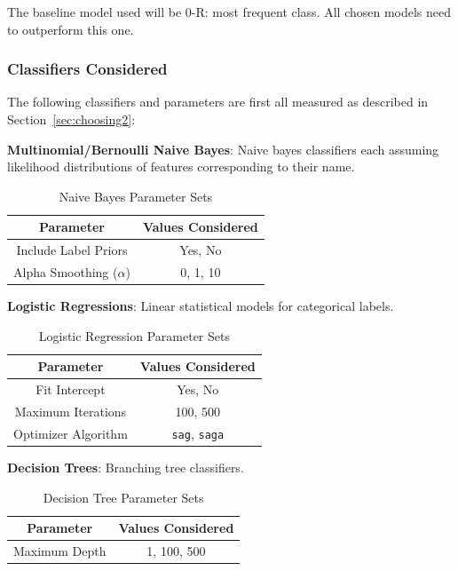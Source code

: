 \documentclass[11pt]{article}
\begin{document}
The baseline model used will be 0-R: most frequent class.
All chosen models need to outperform this one.

\subsubsection{Classifiers Considered}

The following classifiers and parameters are first all measured as described in Section~\ref{sec:choosing2}:

\textbf{Multinomial/Bernoulli Naive Bayes}:
Naive bayes classifiers each assuming likelihood distributions of features corresponding to their name.
\begin{table}[h]
	\begin{center}
		\begin{tabular}{|c|c|}			
			\hline
			Parameter & Values Considered \\
			\hline\hline
			Include Label Priors & Yes, No \\
			Alpha Smoothing ($\alpha$) & 0, 1, 10 \\
			\hline
		\end{tabular}
		\caption{Naive Bayes Parameter Sets}
		\label{tbl:nb-options}
	\end{center}
\end{table}

\textbf{Logistic Regressions}:
Linear statistical models for categorical labels. 
\begin{table}[h]
	\begin{center}
		\begin{tabular}{|c|c|}			
			\hline
			Parameter & Values Considered \\
			\hline\hline
			Fit Intercept & Yes, No \\
			Maximum Iterations & 100, 500 \\
			Optimizer Algorithm & \texttt{sag}, \texttt{saga} \\
			\hline
		\end{tabular}
		\caption{Logistic Regression Parameter Sets}
		\label{tbl:lr-options}
	\end{center}
\end{table}

\textbf{Decision Trees}:
Branching tree classifiers. 
\begin{table}[h]
	\begin{center}
		\begin{tabular}{|c|c|}			
			\hline
			Parameter & Values Considered \\
			\hline\hline
			Maximum Depth & 1, 100, 500 \\
			\hline
		\end{tabular}
		\caption{Decision Tree Parameter Sets}
		\label{tbl:dt-options}
	\end{center}
\end{table}
\end{document}
